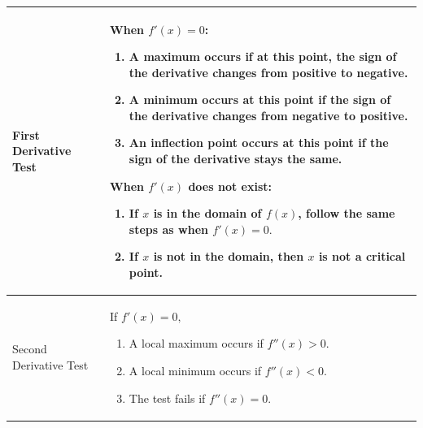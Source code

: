 \documentclass{ximera}
\begin{document}
\begin{tabular}{| l | p{7.5cm} |}
\hline
First Derivative Test & When $f'(x) = 0$: \begin{enumerate}
\item{A maximum occurs if at this point, the sign of the derivative changes from positive to negative.}
\item{A minimum occurs at this point if the sign of the derivative changes from negative to positive.}
\item{An inflection point occurs at this point if the sign of the derivative stays the same.}
\end{enumerate}
When $f'(x)$ does not exist:
\begin{enumerate}
\item{If $x$ is in the domain of $f(x)$, follow the same steps as when $f'(x)=0\text{.}$}
\item{If $x$ is not in the domain, then $x$ is not a critical point.}
\end{enumerate}\\
\hline
Second Derivative Test &  \hspace{5mm}If $f'(x)=0\text{,}$ \begin{enumerate}
\item{A local maximum occurs if $f''(x)>0$.}
\item{A local minimum occurs if $f''(x)<0$.}
\item{The test fails if $f''(x)=0$.}
\end{enumerate}\\ \hline
\end{tabular}
\end{document}
